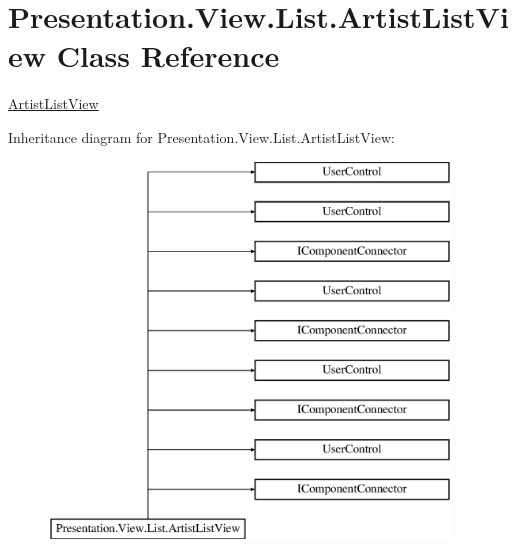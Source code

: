 \hypertarget{class_presentation_1_1_view_1_1_list_1_1_artist_list_view}{}\section{Presentation.\+View.\+List.\+Artist\+List\+View Class Reference}
\label{class_presentation_1_1_view_1_1_list_1_1_artist_list_view}


\hyperlink{class_presentation_1_1_view_1_1_list_1_1_artist_list_view}{Artist\+List\+View}  


Inheritance diagram for Presentation.\+View.\+List.\+Artist\+List\+View\+:\begin{figure}[H]
\begin{center}
\leavevmode
\includegraphics[height=10.000000cm]{class_presentation_1_1_view_1_1_list_1_1_artist_list_view}
\end{center}
\end{figure}
